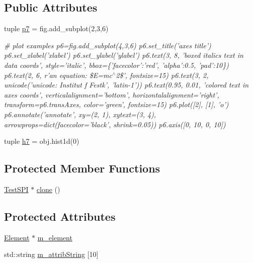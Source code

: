 \subsection*{Public Attributes}
\begin{DoxyCompactItemize}
\item 
tuple \hyperlink{classTestSPI_ada4d8e2279a18e5493a04c94da260d5e}{p7} = fig.add\_\-subplot(2,3,6)
\begin{DoxyCompactList}\small\item\em \# plot examples p6=fig.add\_\-subplot(4,3,6) p6.set\_\-title('axes title') p6.set\_\-xlabel('xlabel') p6.set\_\-ylabel('ylabel') p6.text(3, 8, 'boxed italics text in data coords', style='italic', bbox=\{'facecolor':'red', 'alpha':0.5, 'pad':10\}) p6.text(2, 6, r'an equation: \$E=mc$^\wedge$2\$', fontsize=15) p6.text(3, 2, unicode('unicode: Institut f Festk', 'latin-\/1')) p6.text(0.95, 0.01, 'colored text in axes coords', verticalalignment='bottom', horizontalalignment='right', transform=p6.transAxes, color='green', fontsize=15) p6.plot(\mbox{[}2\mbox{]}, \mbox{[}1\mbox{]}, 'o') p6.annotate('annotate', xy=(2, 1), xytext=(3, 4), arrowprops=dict(facecolor='black', shrink=0.05)) p6.axis(\mbox{[}0, 10, 0, 10\mbox{]}) \item\end{DoxyCompactList}\item 
tuple \hyperlink{classTestSPI_addecac183610bf8070caf3338e94a5c8}{h7} = obj.hist1d(0)
\end{DoxyCompactItemize}
\subsection*{Protected Member Functions}
\begin{DoxyCompactItemize}
\item 
\hyperlink{classTestSPI_1_1TestSPI}{TestSPI} $\ast$ \hyperlink{classTestSPI_afbca7dd9802d226ee1fec8475ff5f127}{clone} ()
\end{DoxyCompactItemize}
\subsection*{Protected Attributes}
\begin{DoxyCompactItemize}
\item 
\hyperlink{classElement}{Element} $\ast$ \hyperlink{classProcessus_aa9d24d53c3e52f36786cabb5d8e296e7}{m\_\-element}
\item 
std::string \hyperlink{classAttrib_a3414521d7a82476e874b25a5407b5e63}{m\_\-attribString} \mbox{[}10\mbox{]}
\end{DoxyCompactItemize}
